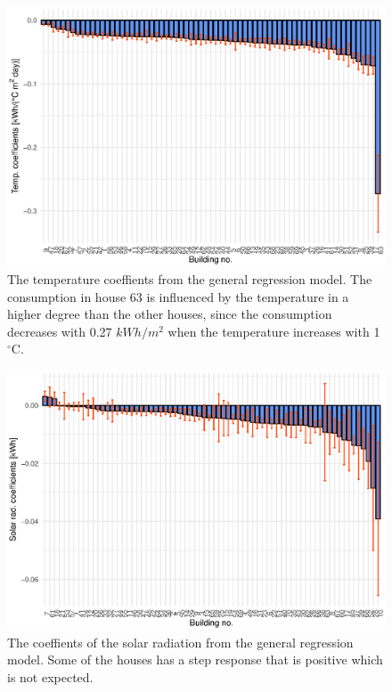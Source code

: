 \begin{figure}[ht]
    \centering
    \includegraphics[width=1.\textwidth]{../../../figures/Temp_coef.eps}
    \caption{The temperature coeffients from the general regression model. The consumption in house 63 is influenced by the temperature in a higher degree than the other houses, since the consumption decreases with 0.27 $kWh/m^2$ when the temperature increases with 1 $^{\circ}$C.}
    \label{fig: Temp_coef}
\end{figure}
\begin{figure}
    \centering
    \includegraphics[width=1.\textwidth]{../../../figures/Solar_coef.eps}
    \caption{The coeffients of the solar radiation from the general regression model. Some of the houses has a step response that is positive which is not expected.}
    \label{fig: Solar_coef}
\end{figure}

